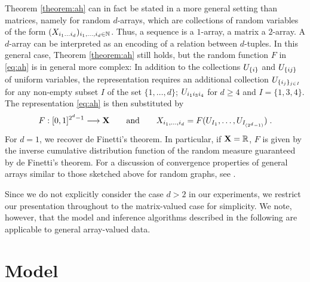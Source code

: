Theorem \ref{theorem:ah} can in fact be stated in a more general setting than matrices, namely for random $d$-arrays, which are collections
of random variables of the form $(X_{i_1\dots i_d})_{i_1,\dots,i_d\in\mathbb{N}}$. Thus, a sequence is a $1$-array, a matrix a $2$-array. A $d$-array 
can be interpreted as an encoding of a relation between $d$-tuples.
In this general case, Theorem \ref{theorem:ah} still holds, but the random function $F$ in \eqref{eq:ah} is in general more complex:
In addition to the collections $U_{\lbrace i\rbrace}$ and $U_{\lbrace ij\rbrace}$ of uniform variables, the representation requires an additional
collection $U_{\lbrace i_j\rbrace_{j\in I}}$ for any non-empty subset $I$ of the set $\lbrace 1,\ldots,d\rbrace$; \eg
$U_{i_1 i_3 i_4}$ for $d\geq 4$ and ${I=\lbrace 1,3,4\rbrace}$. The representation \eqref{eq:ah} is then substituted by
\begin{equation}
  F:[0,1]^{2^d-1}\longrightarrow\mathbf{X}\qquad\text{and}\qquad X_{i_1,\dots,i_d}=F(U_{I_1},\dots,U_{I_{(2^d-1)}})\;.
\end{equation}
For $d=1$, we recover de Finetti's theorem. In particular, if $\mathbf{X}=\mathbb{R}$, $F$ is given by the inverse cumulative distribution function
of the random measure guaranteed by de Finetti's theorem.
For a discussion of convergence properties of general arrays similar to those sketched above for random graphs, see 
\citep{Aldous:2009}.

Since we do not explicitly consider the case $d>2$ in our experiments, we restrict 
our presentation throughout to the matrix-valued case for simplicity. We note, however, that the model and inference algorithms described in the
following are applicable to general array-valued data.






\section{Model}

